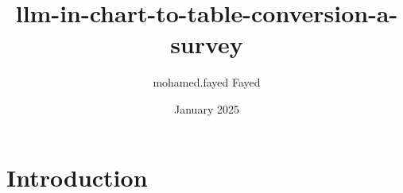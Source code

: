 \documentclass{article}
\title{llm-in-chart-to-table-conversion-a-survey}
\author{mohamed.fayed Fayed}
\date{January 2025}
\begin{document}
\maketitle

\section{Introduction}
\end{document}
